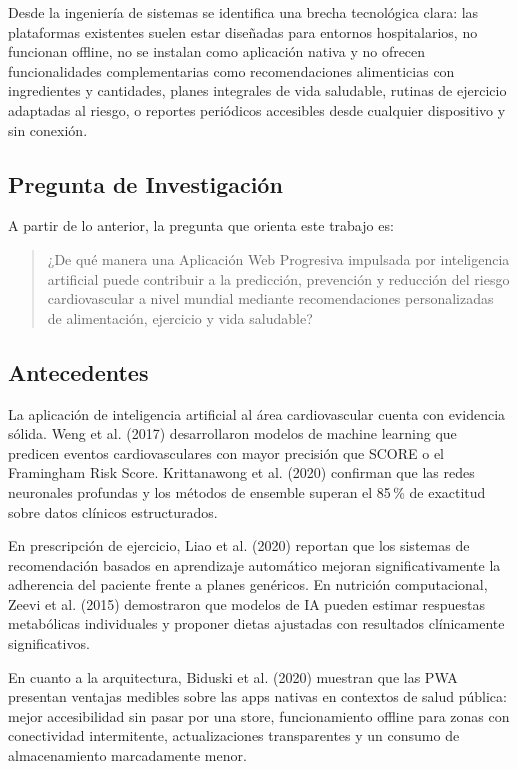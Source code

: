 \documentclass[12pt,letterpaper]{article}
\begin{document}
Desde la ingeniería de sistemas se identifica una brecha tecnológica clara: las
plataformas existentes suelen estar diseñadas para entornos hospitalarios, no
funcionan offline, no se instalan como aplicación nativa y no ofrecen
funcionalidades complementarias como recomendaciones alimenticias con
ingredientes y cantidades, planes integrales de vida saludable, rutinas de
ejercicio adaptadas al riesgo, o reportes periódicos accesibles desde cualquier
dispositivo y sin conexión.

\subsection*{Pregunta de Investigación}

A partir de lo anterior, la pregunta que orienta este trabajo es:

\begin{quote}
¿De qué manera una Aplicación Web Progresiva impulsada por inteligencia
artificial puede contribuir a la predicción, prevención y reducción del riesgo
cardiovascular a nivel mundial mediante recomendaciones personalizadas de
alimentación, ejercicio y vida saludable?
\end{quote}

\subsection*{Antecedentes}

La aplicación de inteligencia artificial al área cardiovascular cuenta con
evidencia sólida. Weng et al. (2017) desarrollaron modelos de machine learning
que predicen eventos cardiovasculares con mayor precisión que SCORE o el
Framingham Risk Score. Krittanawong et al. (2020) confirman que las redes
neuronales profundas y los métodos de ensemble superan el 85\,\% de exactitud
sobre datos clínicos estructurados.

En prescripción de ejercicio, Liao et al. (2020) reportan que los sistemas de
recomendación basados en aprendizaje automático mejoran significativamente la
adherencia del paciente frente a planes genéricos. En nutrición computacional,
Zeevi et al. (2015) demostraron que modelos de IA pueden estimar respuestas
metabólicas individuales y proponer dietas ajustadas con resultados clínicamente
significativos.

En cuanto a la arquitectura, Biduski et al. (2020) muestran que las PWA presentan
ventajas medibles sobre las apps nativas en contextos de salud pública: mejor
accesibilidad sin pasar por una store, funcionamiento offline para zonas con
conectividad intermitente, actualizaciones transparentes y un consumo de
almacenamiento marcadamente menor.
\end{document}

